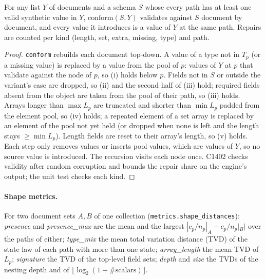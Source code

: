 \begin{proposition}[Conformance]\label{prop:docconform}
For any list $Y$ of documents and a schema $S$ whose every path has at least one valid synthetic value in $Y$,
$\mathrm{conform}(S,Y)$ validates against $S$ document by document, and every value it introduces is a value of
$Y$ at the same path. Repairs are counted per kind (length, set, extra, missing, type) and path.
\end{proposition}
\begin{proof}
\texttt{conform} rebuilds each document top-down. A value of a type not in $T_p$ (or a missing value) is replaced
by a value from the pool of $p$: values of $Y$ at $p$ that validate against the node of $p$, so (i) holds below
$p$. Fields not in $S$ or outside the variant's case are dropped, so (ii) and the second half of (iii) hold;
required fields absent from the object are taken from the pool of their path, so (iii) holds. Arrays longer than
$\max L_p$ are truncated and shorter than $\min L_p$ padded from the element pool, so (iv) holds; a repeated element
of a set array is replaced by an element of the pool not yet held (or dropped when none is left and the length
stays $\ge\min L_p$). Length fields are reset to their array's length, so (v) holds. Each step only removes values
or inserts pool values, which are values of $Y$, so no source value is introduced. The recursion visits each node
once. C1402 checks validity after random corruption and bounds the repair share on the engine's output; the unit
test checks each kind.
\end{proof}

\paragraph{Shape metrics.} For two document sets $A,B$ of one collection (\texttt{metrics.shape\_distances}):
\emph{presence} and \emph{presence\_max} are the mean and the largest $|c_p/n_p|_A-c_p/n_p|_B|$ over the paths of
either; \emph{type\_mix} the mean total variation distance (TVD) of the state law of each path with more than one
state; \emph{array\_length} the mean TVD of $L_p$; \emph{signature} the TVD of the top-level field sets;
\emph{depth} and \emph{size} the TVDs of the nesting depth and of $\lfloor\log_2(1+\#\text{scalars})\rfloor$.

